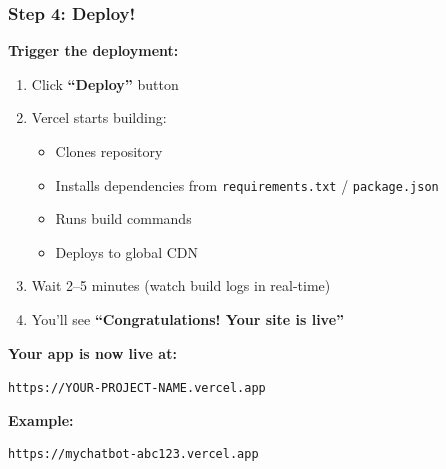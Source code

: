 \begin{frame}[fragile]\frametitle{Step 4: Deploy!}
\textbf{Trigger the deployment:}

  \begin{enumerate}
    \item Click \textbf{``Deploy''} button
    \item Vercel starts building:
      \begin{itemize}
        \item Clones repository
        \item Installs dependencies from \texttt{requirements.txt} / \texttt{package.json}
        \item Runs build commands
        \item Deploys to global CDN
      \end{itemize}
    \item Wait 2--5 minutes (watch build logs in real-time)
    \item You'll see \textbf{``Congratulations! Your site is live''}
  \end{enumerate}

\textbf{Your app is now live at:}
\begin{center}
\texttt{https://YOUR-PROJECT-NAME.vercel.app}
\end{center}

\textbf{Example:}
\begin{lstlisting}
https://mychatbot-abc123.vercel.app
\end{lstlisting}
\end{frame}


